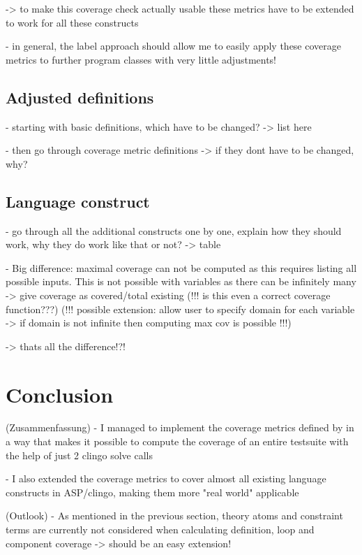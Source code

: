 -> to make this coverage check actually usable these metrics have to be extended to work for all these constructs

- in general, the label approach should allow me to easily apply these coverage metrics to further program classes with very little 
adjustments!

\section{Adjusted definitions}
\label{sec:Coverage for further program classes/Adjusted definitions}
- starting with basic definitions, which have to be changed? -> list here

- then go through coverage metric definitions -> if they dont have to be changed, why?

\section{Language construct}
\label{sec:Coverage for further program classes/Language constructs}
- go through all the additional constructs one by one, explain how they should work, why they do work like that or not?
-> table

- Big difference: maximal coverage can not be computed as this requires listing all possible inputs. This is not possible with variables 
as there can be infinitely many -> give coverage as covered/total existing (!!! is this even a correct coverage function???)
(!!! possible extension: allow user to specify domain for each variable -> if domain is not infinite then computing max cov is possible !!!) 

-> thats all the difference!?!

\chapter{Conclusion}
\label{ch:Conclusion}
(Zusammenfassung)
- I managed to implement the coverage metrics defined by \textcite{Jan+10} in a way that makes it possible to compute the coverage 
of an entire testsuite with the help of just 2 clingo solve calls

- I also extended the coverage metrics to cover almost all existing language constructs in ASP/clingo, making them more "real world" 
applicable


(Outlook)
- As mentioned in the previous section, theory atoms and constraint terms are currently not considered when calculating definition, loop 
and component coverage -> should be an easy extension!

